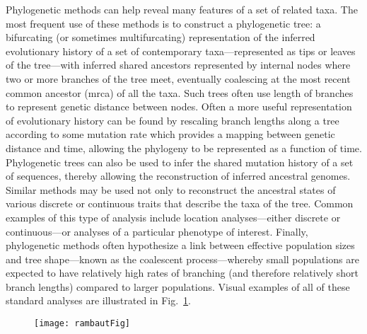 Phylogenetic methods can help reveal many features of a set of related taxa.
The most frequent use of these methods is to construct a phylogenetic tree: a bifurcating (or sometimes multifurcating) representation of the inferred evolutionary history of a set of contemporary taxa---represented as tips or leaves of the tree---with inferred shared ancestors represented by internal nodes where two or more branches of the tree meet, eventually coalescing at the most recent common ancestor (\gls{mrca}) of all the taxa.
Such trees often use length of branches to represent genetic distance between nodes.
Often a more useful representation of evolutionary history can be found by rescaling branch lengths along a tree according to some mutation rate which provides a mapping between genetic distance and time, allowing the phylogeny to be represented as a function of time.
Phylogenetic trees can also be used to infer the shared mutation history of a set of sequences, thereby allowing the reconstruction of inferred ancestral genomes.
Similar methods may be used not only to reconstruct the ancestral states of various discrete or continuous traits that describe the taxa of the tree.
Common examples of this type of analysis include location analyses---either discrete or continuous---or analyses of a particular phenotype of interest.
Finally, phylogenetic methods often hypothesize a link between effective population sizes and tree shape---known as the coalescent process---whereby small populations are expected to have relatively high rates of branching (and therefore relatively short branch lengths) compared to larger populations.
Visual examples of all of these standard analyses are illustrated in Fig.~\ref{fig:phylogeneticsOverview}.

\begin{figure}[ht]
  \centering
  \medskip
  \texttt{[image: rambautFig]}
  \caption[Applications of phylogenetic analysis]{}
  \label{fig:phylogeneticsOverview}
\end{figure}


